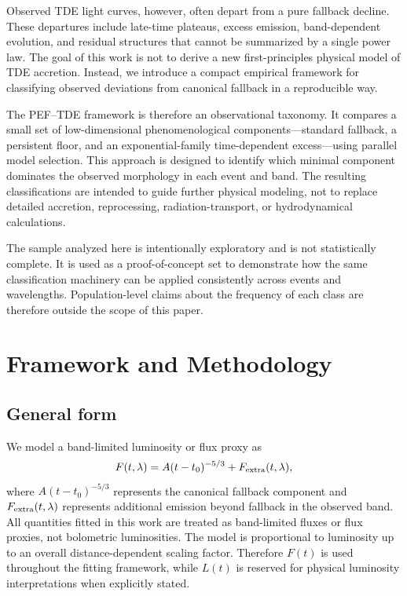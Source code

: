 \documentclass[11pt]{article}
\begin{document}
Observed TDE light curves, however, often depart from a pure fallback decline. These departures include late-time plateaus, excess emission, band-dependent evolution, and residual structures that cannot be summarized by a single power law. The goal of this work is not to derive a new first-principles physical model of TDE accretion. Instead, we introduce a compact empirical framework for classifying observed deviations from canonical fallback in a reproducible way.

The PEF--TDE framework is therefore an observational taxonomy. It compares a small set of low-dimensional phenomenological components---standard fallback, a persistent floor, and an exponential-family time-dependent excess---using parallel model selection. This approach is designed to identify which minimal component dominates the observed morphology in each event and band. The resulting classifications are intended to guide further physical modeling, not to replace detailed accretion, reprocessing, radiation-transport, or hydrodynamical calculations.

The sample analyzed here is intentionally exploratory and is not statistically complete. It is used as a proof-of-concept set to demonstrate how the same classification machinery can be applied consistently across events and wavelengths. Population-level claims about the frequency of each class are therefore outside the scope of this paper.

\section{Framework and Methodology}
\subsection{General form}
We model a band-limited luminosity or flux proxy as
\begin{equation}
F(t,\lambda)=A(t-t_0)^{-5/3}+F_{\rm extra}(t,\lambda),
\label{eq:general}
\end{equation}
where $A(t-t_0)^{-5/3}$ represents the canonical fallback component and $F_{\rm extra}(t,\lambda)$ represents additional emission beyond fallback in the observed band. All quantities fitted in this work are treated as band-limited fluxes or flux proxies, not bolometric luminosities. The model is proportional to luminosity up to an overall distance-dependent scaling factor. Therefore $F(t)$ is used throughout the fitting framework, while $L(t)$ is reserved for physical luminosity interpretations when explicitly stated.
\end{document}
